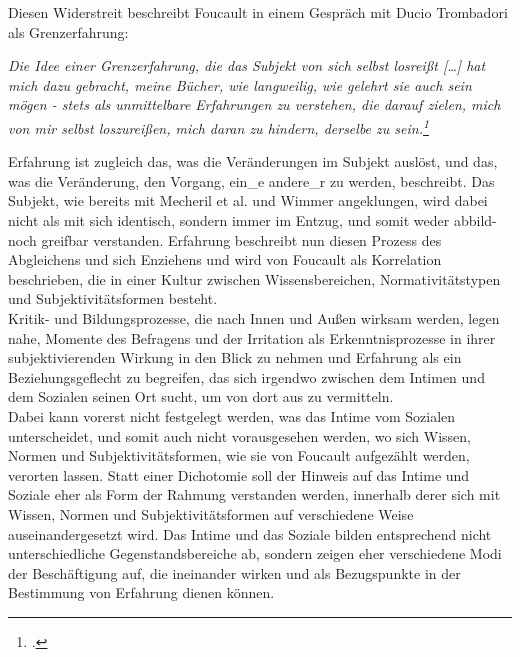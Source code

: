 Diesen Widerstreit beschreibt Foucault in einem Gespräch mit Ducio Trombadori als Grenzerfahrung:
\begin{myenv}
  \textit{\glqq Die Idee einer Grenzerfahrung, die das Subjekt von sich selbst
  losreißt […] hat mich dazu gebracht, meine Bücher, wie langweilig, wie
gelehrt sie auch sein mögen - stets als unmittelbare Erfahrungen zu verstehen,
die darauf zielen, mich von mir selbst loszureißen, mich daran zu hindern,
derselbe zu sein.\grqq\footnotemark \footcitetext{foucinterview}} 
\end{myenv} 
Erfahrung ist zugleich das, was die Veränderungen im Subjekt
auslöst, und das, was die Veränderung, den Vorgang, ein\_e andere\_r zu werden,
beschreibt. Das Subjekt, wie bereits mit Mecheril et al. und Wimmer
angeklungen, wird dabei nicht als mit sich identisch, sondern immer im Entzug,
und somit weder abbild- noch greifbar verstanden. Erfahrung beschreibt nun
diesen Prozess des Abgleichens und sich Enziehens und wird von Foucault als
Korrelation beschrieben, die \glqq in einer Kultur zwischen Wissensbereichen,
Normativitätstypen und Subjektivitätsformen\grqq\footnotemark
{} besteht.\\

\noindent Kritik- und
Bildungsprozesse, die nach Innen und Außen wirksam werden, legen nahe, Momente
des Befragens und der Irritation als Erkenntnisprozesse in ihrer
subjektivierenden Wirkung in den Blick zu nehmen und Erfahrung als ein
Beziehungsgeflecht zu begreifen, das sich irgendwo zwischen dem Intimen und dem
Sozialen seinen Ort sucht, um von dort aus zu vermitteln.\\
Dabei kann vorerst
nicht festgelegt werden, was das Intime vom Sozialen unterscheidet, und somit
auch nicht vorausgesehen werden, wo sich Wissen, Normen und
Subjektivitätsformen, wie sie von Foucault aufgezählt werden, verorten lassen.
Statt einer Dichotomie soll der Hinweis auf das Intime und Soziale eher als
Form der Rahmung verstanden werden, innerhalb derer sich mit Wissen, Normen und
Subjektivitätsformen auf verschiedene Weise auseinandergesetzt wird. Das Intime
und das Soziale bilden entsprechend nicht unterschiedliche Gegenstandsbereiche
ab, sondern zeigen eher verschiedene Modi der Beschäftigung auf, die ineinander
wirken und als Bezugspunkte in der Bestimmung von Erfahrung dienen können.\\
 
